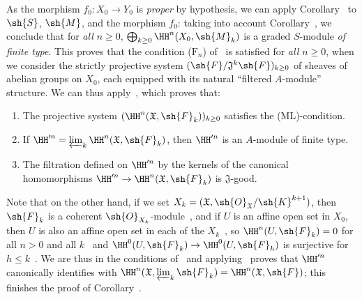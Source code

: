 As the morphism $f_0:X_0\to Y_0$ is \emph{proper} by hypothesis, we can apply Corollary~ to $\sh{S}$, $\sh{M}$, and the morphism $f_0$: taking into account Corollary~, we conclude that for \emph{all $n\geq 0$}, $\bigoplus_{k\geq 0}\HH^n(X_0,\sh{M}_k)$ is a graded $S$-module \emph{of finite type}.
This proves that the condition ($\text{F}_n$) of~ is satisfied for \emph{all $n\geq 0$}, when we consider the strictly projective system $(\sh{F}/\mathfrak{J}^k\sh{F})_{k\geq 0}$ of sheaves of abelian groups on $X_0$, each equipped with its natural ``filtered $A$-module'' structure.
We can thus apply~, which proves that:
\begin{enumerate}
  \item[1st.] The projective system $(\HH^n(\mathfrak{X},\sh{F}_k))_{k\geq 0}$ satisfies the (ML)-condition.
  \item[2nd.] If $\HH^{\prime n}=\varprojlim_k\HH^n(\mathfrak{X},\sh{F}_k)$, then $\HH^{\prime n}$ is an $A$-module of finite type.
  \item[3rd.] The filtration defined on $\HH^{\prime n}$ by the kernels of the canonical homomorphisms $\HH^{\prime n}\to\HH^n(\mathfrak{X},\sh{F}_k)$ is $\mathfrak{J}$-good.
\end{enumerate}

Note that on the other hand, if we set $X_k=(\mathfrak{X},\sh{O}_\mathfrak{X}/\sh{K}^{k+1})$, then $\sh{F}_k$ is a coherent $\sh{O}_{X_k}$-module~, and if $U$ is an affine open set in $X_0$, then $U$ is also an affine open set in each of the $X_k$~, so $\HH^n(U,\sh{F}_k)=0$ for all $n>0$ and all $k$~ and $\HH^0(U,\sh{F}_k)\to\HH^0(U,\sh{F}_h)$ is surjective for $h\leq k$~.
We are thus in the conditions of~ and applying~ proves that $\HH^{\prime n}$ canonically identifies with $\HH^n(\mathfrak{X},\varprojlim_k\sh{F}_k)=\HH^n(\mathfrak{X},\sh{F})$; this finishes the proof of Corollary~.

